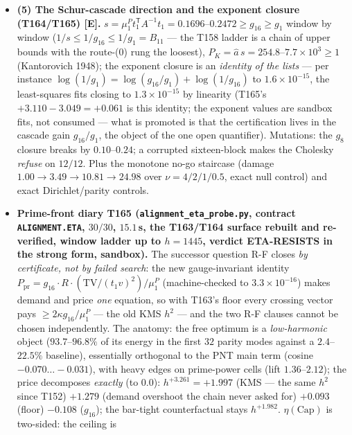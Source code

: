 \documentclass[11pt]{article}
\providecommand{\mE}{\textbf{[E]}}\providecommand{\mC}{\textbf{[C]}}
\begin{document}
\begin{itemize}[leftmargin=1.5em]
{R-F conjunction is empty by an identity plus a floor, a certificate and not a failed
search} (T165's ascent stays sandbox, no search is run). Mutation: $(t_1v)$
unsquared scales like $t$ and moves by $1.0$--$1.0\times10^{4}$.
\item \textbf{(5) The Schur-cascade direction and the exponent closure (T164/T165)
\mE.} $s=\mu^P_1t_1^{\mathsf T}A^{-1}t_1=0.1696$--$0.2472\ge g_{16}\ge g_1$ window by
window ($1/s\le1/g_{16}\le1/g_1=B_{11}$ --- the T158 ladder is a chain of upper
bounds with the route-(0) rung the loosest), $P_K=\hat a\,s=254.8$--$7.7\times10^{3}
\ge1$ (Kantorovich 1948); the exponent closure is an \emph{identity of the lists}
--- per instance $\log(1/g_1)=\log(g_{16}/g_1)+\log(1/g_{16})$ to
$1.6\times10^{-15}$, the least-squares fits closing to $1.3\times10^{-15}$ by
linearity (T165's $+3.110-3.049=+0.061$ is this identity; the exponent values are
sandbox fits, not consumed --- what is promoted is that the certification lives in
the cascade gain $g_{16}/g_1$, the object of the one open quantifier). Mutations:
the $g_8$ closure breaks by $0.10$--$0.24$; a corrupted sixteen-block makes the
Cholesky \emph{refuse} on $12/12$. Plus the monotone no-go staircase (damage
$1.00\to3.49\to10.81\to24.98$ over $\nu=4/2/1/0.5$, exact null control) and exact
Dirichlet/parity controls.
\item \textbf{Prime-front diary T165 (\texttt{alignment\_eta\_probe.py}, contract
\texttt{ALIGNMENT.ETA}, $30/30$, $15.1$\,s, the T163/T164 surface rebuilt and
re-verified, window ladder up to $h=1445$, verdict ETA-RESISTS in the strong form,
sandbox).} The successor question R-F closes \emph{by certificate, not by failed
search}: the new gauge-invariant identity
$P_{\mathrm{pr}}=g_{16}\cdot R\cdot(\mathrm{TV}/(t_1v)^2)/\mu^P_1$ (machine-checked
to $3.3\times10^{-16}$) makes demand and price \emph{one} equation, so with T163's
floor every crossing vector pays $\ge2\kappa g_{16}/\mu^P_1$ --- the old KMS $h^2$
--- and the two R-F clauses cannot be chosen independently. The anatomy: the free
optimum is a \emph{low-harmonic} object ($93.7$--$96.8\%$ of its energy in the first
$32$ parity modes against a $2.4$--$22.5\%$ baseline), essentially orthogonal to the
PNT main term (cosine $-0.070\ldots-0.031$), with heavy edges on prime-power cells
(lift $1.36$--$2.12$); the price decomposes \emph{exactly} (to $0.0$):
$h^{+3.261}=+1.997$ (KMS --- the same $h^2$ since T152) $+1.279$ (demand overshoot
the chain never asked for) $+0.093$ (floor) $-0.108$ ($g_{16}$); the bar-tight
counterfactual stays $h^{+1.982}$. $\eta(\mathrm{Cap})$ is two-sided: the ceiling is

\end{itemize}
\end{document}
